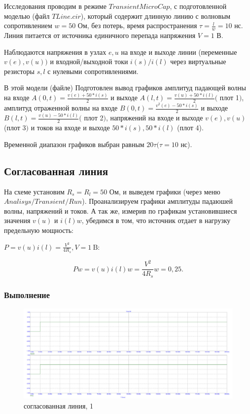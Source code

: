 \documentclass[a4paper, 14pt]{extarticle}%
\begin{document}
Исследования проводим в режиме $Transient MicroCap$, с подготовленной моделью (файл $TLine.cir$), который содержит длинную линию с волновым сопротивлением $w = 50$ Ом, без потерь, время распространения $\tau=\frac{l}{w}=10$ нс. Линия питается от источника единичного перепада напряжения $V=1$ В.

Наблюдаются напряжения в узлах $e, u$ на входе и выходе линии (переменные $v(e), v(u))$ и входной/выходной токи $i(s) / i(l)$ через виртуальные резисторы $s, l$ с нулевыми сопротивлениями.

В этой модели (файле) Подготовлен вывод графиков амплитуд падающей волны на входе $A(0, t)=\frac{v(e)+50 * i(s)}{2}$ и выходе $A(l, t)=\frac{v(u)+50 * i(l)}{2}($ плот 1$)$, амплитуд отраженной волны на входе $B(0, t)=\frac{v^{2}(e)-50 * i(s)}{2}$ и выходе $B(l, t)=\frac{v(u)-50 * i(l)}{2}($ плот 2$)$, напряжений на входе и выходе $v(e), v(u)$ (плот 3$)$ и токов на входе и выходе $50 * i(s), 50 * i(l)$ (плот 4). 

Временной диапазон графиков выбран равным $20 \tau (\tau = 10$ нс). 


\subsection{Согласованная линия}

На схеме установим $R_{s}=R_{l}=50$ Ом, и выведем графики (через меню $Analisys/Transient/Run$). Проанализируем графики амплитуды падаюшей волны, напряжений и токов. А так же, измерив по графикам установившиеся значения $v(u)$ и $i(l) w$, убедимся в том, что источник отдает в нагрузку предельную мощность:

$P=v(u) i(l)=\frac{V^{2}}{4 R_{s}}, V=1 \mathrm{~B}:$

\[P w=v(u) i(l) w=\frac{V^{2}}{4 R_{s}} w=0,25 .\]

\subsubsection{Выполнение}

\begin{figure}[h!]
			\centering
			\includegraphics[width=1.1\linewidth]{./graphs/1.jpg}
			\caption{согласованная линия, 1}
			\label{1.1}
\end{figure}
\end{document}
